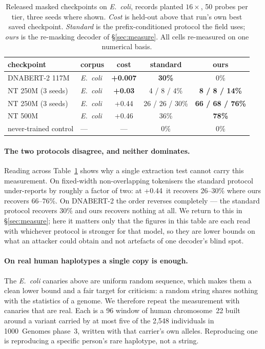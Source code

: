\begin{table}[t]
\centering
\caption{Released masked checkpoints on \emph{E.~coli}, records planted $16\times$, 50 probes per
tier, three seeds where shown. \emph{Cost} is held-out \bits{} above that run's own best saved
checkpoint. \emph{Standard} is the prefix-conditioned protocol the field uses; \emph{ours} is the
re-masking decoder of \S\ref{sec:measure}. All cells re-measured on one numerical basis.}
\label{tab:cost}
\begin{tabular}{llccc}
\toprule
checkpoint & corpus & cost & standard & ours \\
\midrule
DNABERT-2 117M      & \emph{E.~coli} & \textbf{+0.007} & \textbf{30\%}      & 0\% \\
NT 250M (3 seeds)   & \emph{E.~coli} & \textbf{+0.03}  & 4 / 8 / 4\%        & \textbf{8 / 8 / 14\%} \\
NT 250M (3 seeds)   & \emph{E.~coli} & +0.44           & 26 / 26 / 30\%     & \textbf{66 / 68 / 76\%} \\
NT 500M             & \emph{E.~coli} & +0.46           & 36\%               & \textbf{78\%} \\
\midrule
never-trained control & --- & --- & 0\% & 0\% \\
\bottomrule
\end{tabular}
\end{table}

\paragraph{The two protocols disagree, and neither dominates.}
Reading across Table~\ref{tab:cost} shows why a single extraction test cannot carry this
measurement. On fixed-width non-overlapping tokenisers the standard protocol under-reports by
roughly a factor of two: at +0.44\,\bits{} it recovers 26--30\% where ours recovers 66--76\%. On
DNABERT-2 the order reverses completely --- the standard protocol recovers 30\% and ours recovers
nothing at all. We return to this in \S\ref{sec:measure}; here it matters only that the figures in
this table are each read with whichever protocol is stronger for that model, so they are lower
bounds on what an attacker could obtain and not artefacts of one decoder's blind spot.

\paragraph{On real human haplotypes a single copy is enough.}
The \emph{E.~coli} canaries above are uniform random sequence, which makes them a clean lower bound
and a fair target for criticism: a random string shares nothing with the statistics of a genome. We
therefore repeat the measurement with canaries that are real. Each is a 96\nt{} window of human
chromosome~22 built around a variant carried by at most five of the 2{,}548 individuals in
1000~Genomes phase~3, written with that carrier's own alleles. Reproducing one is reproducing a
specific person's rare haplotype, not a string.

